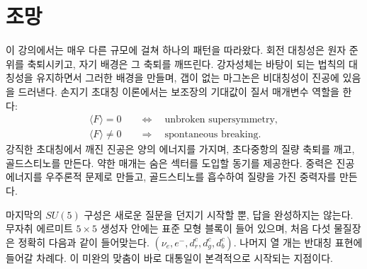 \begin{classroomqa}
\end{classroomqa}

\section{조망}

이 강의에서는 매우 다른 규모에 걸쳐 하나의 패턴을 따라왔다. 회전 대칭성은 원자 준위를 축퇴시키고, 자기 배경은 그 축퇴를 깨뜨린다. 강자성체는 바탕이 되는 법칙의 대칭성을 유지하면서 그러한 배경을 만들며, 갭이 없는 마그논은 비대칭성이 진공에 있음을 드러낸다. 손지기 초대칭 이론에서는 보조장의 기대값이 질서 매개변수 역할을 한다:
\begin{equation}
\begin{aligned}
\langle F\rangle=0
&\quad\Longleftrightarrow\quad
\text{unbroken supersymmetry},\\
\langle F\rangle\neq0
&\quad\Longrightarrow\quad
\text{spontaneous breaking}.
\end{aligned}
\end{equation}
강직한 초대칭에서 깨진 진공은 양의 에너지를 가지며, 초다중항의 질량 축퇴를 깨고, 골드스티노를 만든다. 약한 매개는 숨은 섹터를 도입할 동기를 제공한다. 중력은 진공 에너지를 우주론적 문제로 만들고, 골드스티노를 흡수하여 질량을 가진 중력자를 만든다.

마지막의 \(SU(5)\) 구성은 새로운 질문을 던지기 시작할 뿐, 답을 완성하지는 않는다. 무자취 에르미트 \(5\times5\) 생성자 안에는 표준 모형 블록이 들어 있으며, 처음 다섯 물질장은 정확히 다음과 같이 들어맞는다.
\((\nu_e,e^-,d^c_r,d^c_g,d^c_b)\). 나머지 열 개는 반대칭 표현에 들어갈 차례다. 이 미완의 맞춤이 바로 대통일이 본격적으로 시작되는 지점이다.
